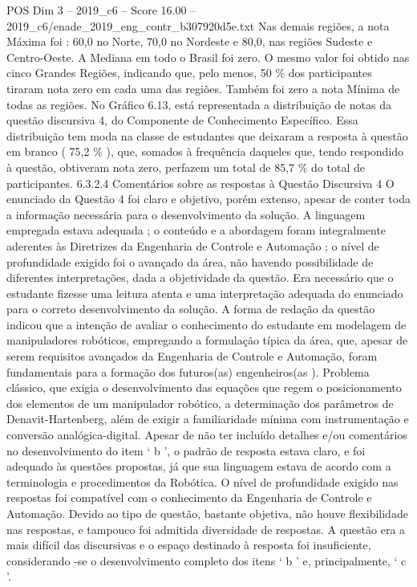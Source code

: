 \begin{textsample}{POS Dim 3 – 2019\_c6 – Score 16.00 – 2019\_c6/enade\_2019\_eng\_contr\_b307920d5e.txt}
Nas demais regiões, a nota Máxima foi : 60,0 no Norte, 70,0 no Nordeste e 80,0, nas regiões Sudeste e Centro-Oeste.
A Mediana em todo o Brasil foi zero.
O mesmo valor foi obtido nas cinco Grandes Regiões, indicando que, pelo menos, 50 \% dos participantes tiraram nota zero em cada uma das regiões.
Também foi zero a nota Mínima de todas as regiões.
No Gráfico 6.13, está representada a distribuição de notas da questão discursiva 4, do Componente de Conhecimento Específico.
Essa distribuição tem moda na classe de estudantes que deixaram a resposta à questão em branco ( 75,2 \% ), que, somados à frequência daqueles que, tendo respondido à questão, obtiveram nota zero, perfazem um total de 85,7 \% do total de participantes. 6.3.2.4 Comentários sobre as respostas à Questão Discursiva 4 O enunciado da Questão 4 foi claro e objetivo, porém extenso, apesar de conter toda a informação necessária para o desenvolvimento da solução.
A linguagem empregada estava adequada ; o conteúdo e a abordagem foram integralmente aderentes às Diretrizes da Engenharia de Controle e Automação ; o nível de profundidade exigido foi o avançado da área, não havendo possibilidade de diferentes interpretações, dada a objetividade da questão.
Era necessário que o estudante fizesse uma leitura atenta e uma interpretação adequada do enunciado para o correto desenvolvimento da solução.
A forma de redação da questão indicou que a intenção de avaliar o conhecimento do estudante em modelagem de manipuladores robóticos, empregando a formulação típica da área, que, apesar de serem requisitos avançados da Engenharia de Controle e Automação, foram fundamentais para a formação dos futuros(as) engenheiros(as ).
Problema clássico, que exigia o desenvolvimento das equações que regem o posicionamento dos elementos de um manipulador robótico, a determinação dos parâmetros de Denavit-Hartenberg, além de exigir a familiaridade mínima com instrumentação e conversão analógica-digital.
Apesar de não ter incluído detalhes e/ou comentários no desenvolvimento do item ‘ b ’, o padrão de resposta estava claro, e foi adequado às questões propostas, já que sua linguagem estava de acordo com a terminologia e procedimentos da Robótica.
O nível de profundidade exigido nas respostas foi compatível com o conhecimento da Engenharia de Controle e Automação.
Devido ao tipo de questão, bastante objetiva, não houve flexibilidade nas respostas, e tampouco foi admitida diversidade de respostas.
A questão era a mais difícil das discursivas e o espaço destinado à resposta foi insuficiente, considerando -se o desenvolvimento completo dos itens ‘ b ’ e, principalmente, ‘ c ’.

\end{textsample}
